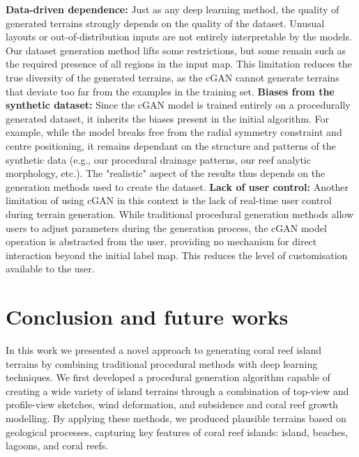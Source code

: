\begin{Itemize}
    \Item{} \textbf{Data-driven dependence:} Just as any deep learning method, the quality of generated terrains strongly depends on the quality of the dataset. Unusual layouts or out-of-distribution inputs are not entirely interpretable by the models. Our dataset generation method lifts some restrictions, but some remain such as the required presence of all regions in the input map. This limitation reduces the true diversity of the generated terrains, as the cGAN cannot generate terrains that deviate too far from the examples in the training set.
    \Item{} \textbf{Biases from the synthetic dataset:} Since the cGAN model is trained entirely on a procedurally generated dataset, it inherits the biases present in the initial algorithm. For example, while the model breaks free from the radial symmetry constraint and centre positioning, it remains dependant on the structure and patterns of the synthetic data (e.g., our procedural drainage patterns, our reef analytic morphology, etc.). %
    The "realistic" aspect of the results thus depends on the generation methods used to create the dataset.
    \Item{} \textbf{Lack of user control:} Another limitation of using cGAN in this context is the lack of real-time user control during terrain generation. While traditional procedural generation methods allow users to adjust parameters during the generation process, the cGAN model operation is abstracted from the user, providing no mechanism for direct interaction beyond the initial label map. This reduces the level of customisation available to the user.
\end{Itemize}

\section{Conclusion and future works}
\label{sec:coral-island-conclusion}

In this work we presented a novel approach to generating coral reef island terrains by combining traditional procedural methods with deep learning techniques. We first developed a procedural generation algorithm capable of creating a wide variety of island terrains through a combination of top-view and profile-view sketches, wind deformation, and subsidence and coral reef growth modelling. By applying these methods, we produced plausible terrains based on geological processes, capturing key features of coral reef islands: island, beaches, lagoons, and coral reefs.

